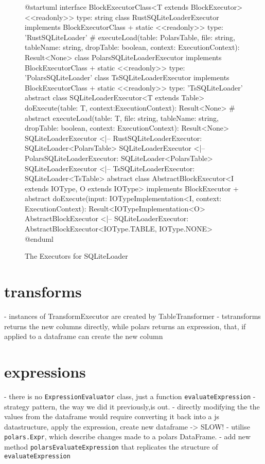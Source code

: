 \begin{figure}
	\begin{plantuml}
		@startuml
		interface BlockExecutorClass<T extends BlockExecutor> {
				<<readonly>> type: string
			}
		class RustSQLiteLoaderExecutor implements BlockExecutorClass {
		+ {static} <<readonly>> type: 'RustSQLiteLoader'
		# executeLoad(table: PolarsTable, file: string, tableName: string, dropTable: boolean, context: ExecutionContext): Result<None>
		}
		class PolarsSQLiteLoaderExecutor implements BlockExecutorClass {
		+ {static} <<readonly>> type: 'PolarsSQLiteLoader'
		}
		class TsSQLiteLoaderExecutor implements BlockExecutorClass {
		+ {static} <<readonly>> type: 'TsSQLiteLoader'
		}
		abstract class SQLiteLoaderExecutor<T extends Table> {
		doExecute(table: T, context:ExecutionContext): Result<None>
		# {abstract} executeLoad(table: T, file: string, tableName: string, dropTable: boolean, context: ExecutionContext): Result<None>
		}
		SQLiteLoaderExecutor <|-- RustSQLiteLoaderExecutor: SQLiteLoader<PolarsTable>
		SQLiteLoaderExecutor <|-- PolarsSQLiteLoaderExecutor: SQLiteLoader<PolarsTable>
		SQLiteLoaderExecutor <|-- TsSQLiteLoaderExecutor: SQLiteLoader<TsTable>
		abstract class AbstractBlockExecutor<I extends IOType, O extends IOType> implements BlockExecutor {
		+ {abstract} doExecute(input: IOTypeImplementation<I\>, context: ExecutionContext): Result<IOTypeImplementation<O>\>
		}
		AbstractBlockExecutor <|-- SQLiteLoaderExecutor: AbstractBlockExecutor<IOType.TABLE, IOType.NONE>
		@enduml
	\end{plantuml}
	\caption{The Executors for SQLiteLoader}
	\label{fig:uml:sqliteloaderexecutor:combined}
\end{figure}


\section{transforms}
- instances of TransformExecutor are created by TableTransformer
- tstransforms returns the new columns directly, while polars returns an expression, that, if applied to a dataframe can create the new column

\section{expressions}
- there is no \Verb|ExpressionEvaluator| class, just a function \Verb|evaluateExpression|
- strategy pattern, the way we did it previously,is out.
- directly modifying the the values from the dataframe would require converting it back into a js datastructure, apply the expression, create new dataframe -> SLOW!
- utilise \Verb|polars.Expr|, which describe changes made to a polars DataFrame.
- add new method \Verb|polarsEvaluateExpression| that replicates the structure of \Verb|evaluateExpression|

